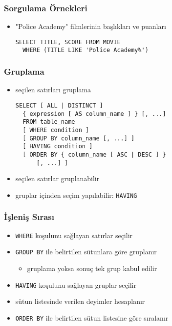 \documentclass[dvipsnames]{beamer}
\theoremstyle{plain}
\begin{document}
\begin{frame}[fragile]
  \frametitle{Sorgulama Örnekleri}

  \begin{itemize}
    \item "Police Academy" filmlerinin başlıkları ve puanları
    \begin{lstlisting}
SELECT TITLE, SCORE FROM MOVIE
  WHERE (TITLE LIKE 'Police Academy%')
    \end{lstlisting}
  \end{itemize}
\end{frame}

\begin{frame}[fragile]
  \frametitle{Gruplama}

  \begin{itemize}
  \item seçilen satırları gruplama
    \begin{lstlisting}
SELECT [ ALL | DISTINCT ]
  { expression [ AS column_name ] } [, ...]
  FROM table_name
  [ WHERE condition ]
  [ GROUP BY column_name [, ...] ]
  [ HAVING condition ]
  [ ORDER BY { column_name [ ASC | DESC ] }
      [, ...] ]
    \end{lstlisting}

  \medskip
    \item seçilen satırlar gruplanabilir
    \item gruplar içinden seçim yapılabilir: \lstinline!HAVING!
  \end{itemize}
\end{frame}

\begin{frame}
  \frametitle{İşleniş Sırası}

  \begin{itemize}
    \item \lstinline!WHERE! koşulunu sağlayan satırlar seçilir

    \pause
    \item \lstinline!GROUP BY! ile belirtilen sütunlara göre gruplanır
    \begin{itemize}
      \item gruplama yoksa sonuç tek grup kabul edilir
    \end{itemize}

    \pause
    \item \lstinline!HAVING! koşulunu sağlayan gruplar seçilir

    \pause
    \item sütun listesinde verilen deyimler hesaplanır

    \pause
    \item \lstinline!ORDER BY! ile belirtilen sütun listesine göre sıralanır
  \end{itemize}
\end{frame}
\end{document}
